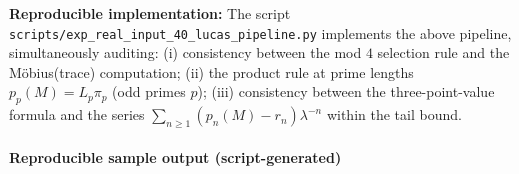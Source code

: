 \begin{remark}
\par
\textbf{Reproducible implementation:} The script \texttt{scripts/exp\_real\_input\_40\_lucas\_pipeline.py} implements the above pipeline, simultaneously auditing:
(i) consistency between the mod \(4\) selection rule and the M\"obius(trace) computation;
(ii) the product rule at prime lengths \(p_p(M)=L_p\pi_p\) (odd primes \(p\));
(iii) consistency between the three-point-value formula and the series \(\sum_{n\ge 1}(p_n(M)-r_n)\lambda^{-n}\) within the tail bound.
\end{remark}
\paragraph{Reproducible sample output (script-generated)}

















